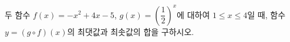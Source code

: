 두 함수 $f(x)=-x^2+4x-5$, $g(x)=\left(\dfrac{1}{2}\right)^{x}$에 대하여 $1\le x\le 4$일 때, 함수 $y=(g\circ f)(x)$의 최댓값과 최솟값의 합을 구하시오.

